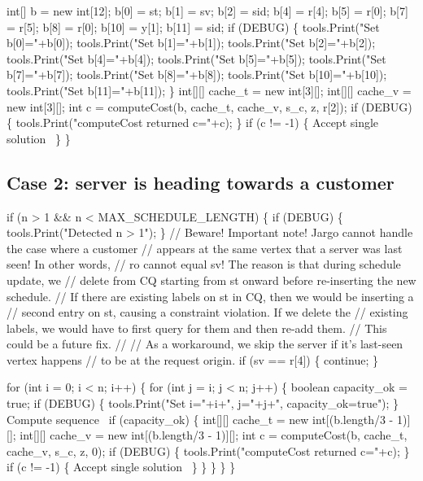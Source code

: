   int[] b = new int[12];
  b[0] = st;
  b[1] = sv;
  b[2] = sid;
  b[4] = r[4];
  b[5] = r[0];
  b[7] = r[5];
  b[8] = r[0];
  b[10] = y[1];
  b[11] = sid;
  if (DEBUG) \{
    tools.Print("Set b[0]="+b[0]);
    tools.Print("Set b[1]="+b[1]);
    tools.Print("Set b[2]="+b[2]);
    tools.Print("Set b[4]="+b[4]);
    tools.Print("Set b[5]="+b[5]);
    tools.Print("Set b[7]="+b[7]);
    tools.Print("Set b[8]="+b[8]);
    tools.Print("Set b[10]="+b[10]);
    tools.Print("Set b[11]="+b[11]);
  \}
  int[][] cache_t = new int[3][];
  int[][] cache_v = new int[3][];
  int c = computeCost(b, cache_t, cache_v, s_c, z, r[2]);
  if (DEBUG) \{
    tools.Print("computeCost returned c="+c);
  \}
  if (c != -1) \{
    \LA{}Accept single solution~{\nwtagstyle{}}\RA{}
  \}
\}
\nwendcode{}\nwdocspar

\subsection{Case 2: server is heading towards a customer}
\nwenddocs{}\endmoddef\nwstartdeflinemarkup{}\nwenddeflinemarkup
if (n > 1 && n < MAX_SCHEDULE_LENGTH) \{
  if (DEBUG) \{
    tools.Print("Detected n > 1");
  \}
  // Beware! Important note! Jargo cannot handle the case where a customer
  // appears at the same vertex that a server was last seen! In other words,
  // ro cannot equal sv! The reason is that during schedule update, we
  // delete from CQ starting from st onward before re-inserting the new schedule.
  // If there are existing labels on st in CQ, then we would be inserting a
  // second entry on st, causing a constraint violation. If we delete the
  // existing labels, we would have to first query for them and then re-add them.
  // This could be a future fix.
  //
  // As a workaround, we skip the server if it's last-seen vertex happens
  // to be at the request origin.
  if (sv == r[4]) \{
    continue;
  \}

  for (int i = 0; i < n; i++) \{
    for (int j = i; j < n; j++) \{
      boolean capacity_ok = true;
      if (DEBUG) \{
        tools.Print("Set i="+i+", j="+j+", capacity_ok=true");
      \}
      \LA{}Compute sequence~{\nwtagstyle{}}\RA{}
      if (capacity_ok) \{
        int[][] cache_t = new int[(b.length/3 - 1)][];
        int[][] cache_v = new int[(b.length/3 - 1)][];
        int c = computeCost(b, cache_t, cache_v, s_c, z, 0);
        if (DEBUG) \{
          tools.Print("computeCost returned c="+c);
        \}
        if (c != -1) \{
          \LA{}Accept single solution~{\nwtagstyle{}}\RA{}
        \}
      \}
    \}
  \}
\}
\nwendcode{}\nwdocspar

